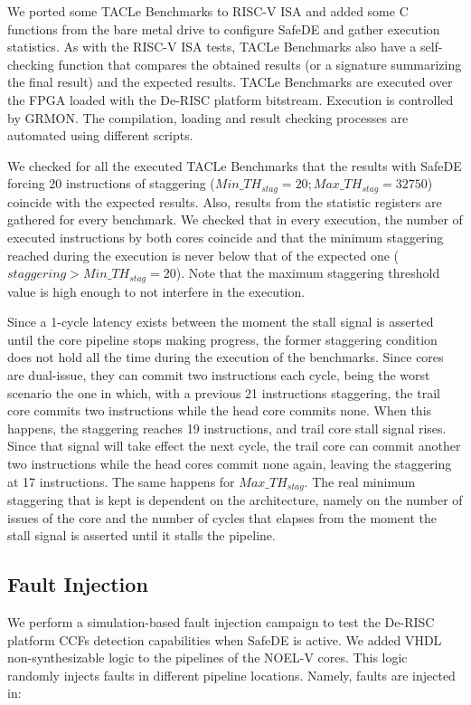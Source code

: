 We ported some TACLe Benchmarks to RISC-V ISA and added some C functions from the bare metal drive to configure SafeDE and gather execution statistics. As with the RISC-V ISA tests, TACLe Benchmarks also have a self-checking function that compares the obtained results (or a signature summarizing the final result) and the expected results. TACLe Benchmarks are executed over the FPGA loaded with the De-RISC platform bitstream. Execution is controlled by GRMON. The compilation, loading and result checking processes are automated using different scripts. 

We checked for all the executed TACLe Benchmarks that the results with SafeDE forcing 20 instructions of staggering ($Min\_TH_{stag} = 20; Max\_TH_{stag} = 32750$) coincide with the expected results. Also, results from the statistic registers are gathered for every benchmark. We checked that in every execution, the number of executed instructions by both cores coincide and that the minimum staggering reached during the execution is never below that of the expected one ($staggering > Min\_TH_{stag} = 20$). Note that the maximum staggering threshold value is high enough to not interfere in the execution.

Since a 1-cycle latency exists between the moment the stall signal is asserted until the core pipeline stops making progress, the former staggering condition does not hold all the time during the execution of the benchmarks. Since cores are dual-issue, they can commit two instructions each cycle, being the worst scenario the one in which, with a previous 21 instructions staggering, the trail core commits two instructions while the head core commits none. When this happens, the staggering reaches 19 instructions, and trail core stall signal rises. Since that signal will take effect the next cycle, the trail core can commit another two instructions while the head cores commit none again, leaving the staggering at 17 instructions. The same happens for $Max\_TH_{stag}$. The real minimum staggering that is kept is dependent on the architecture, namely on the number of issues of the core and the number of cycles that elapses from the moment the stall signal is asserted until it stalls the pipeline. 

\bigskip



\subsection{Fault Injection}
We perform a simulation-based fault injection campaign to test the De-RISC platform CCFs detection capabilities when SafeDE is active. We added VHDL non-synthesizable logic to the pipelines of the NOEL-V cores. This logic randomly injects faults in different pipeline locations. Namely, faults are injected in:

